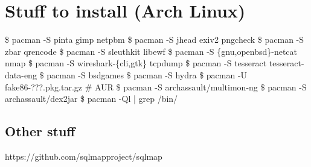 \documentclass{refcard}
\begin{document}
\section{Stuff to install \hfill {\normalsize (Arch Linux)}}



\begin{ldesc}
	  \$ pacman -S pinta gimp netpbm
	    \$ pacman -S jhead exiv2 pngcheck
	\li[QR/Barcode]        \$ pacman -S zbar qrencode
	        \$ pacman -S sleuthkit libewf
	    \$ pacman -S \{gnu,openbsd\}-netcat nmap
	    \$ pacman -S wireshark-\{cli,gtk\} tcpdump
	\li[OCR]               \$ pacman -S tesseract tesseract-data-eng %
	\li[En/Decoding]       \$ pacman -S bsdgames
	  \$ pacman -S hydra
	\li[8086 emulator] \$ pacman -U fake86-???.pkg.tar.gz  \# AUR
	        \$ pacman -S archassault/multimon-ng
	\li[Android]           \$ pacman -S archassault/dex2jar
	   \$ pacman -Ql  | grep /bin/
\end{ldesc}

\subsection{Other stuff}
\begin{ldesc}
	\lI[SQLi]     https://github.com/sqlmapproject/sqlmap
\end{ldesc}
\end{document}
